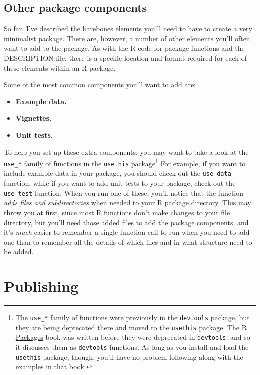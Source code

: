 \documentclass[]{tufte-book}
\providecommand{\tightlist}{%
  \setlength{\itemsep}{0pt}\setlength{\parskip}{0pt}}
\begin{document}
\hypertarget{other-package-components}{%
\subsection{Other package components}\label{other-package-components}}

So far, I've described the barebones elements you'll need to have to create a very
minimalist package. There are, however, a number of other elements you'll often
want to add to the package. As with the R code for package functions and the
DESCRIPTION file, there is a specific location and format required for each of
these elements within an R package.

Some of the most common components you'll want to add are:

\begin{itemize}
\tightlist
\item
  \textbf{Example data.}
\item
  \textbf{Vignettes.}
\item
  \textbf{Unit tests.}
\end{itemize}

To help you set up these extra components,
you may want to take a look at the \texttt{use\_*} family of functions in the \texttt{usethis}
\citep{R-usethis}
package\footnote{The \texttt{use\_*} family of functions were previously in the \texttt{devtools} package, but they
  are being deprecated there and moved to the \texttt{usethis}
  package. The \href{http://r-pkgs.had.co.nz/}{R Packages} book was written before they were deprecated
  in \texttt{devtools}, and so it discusses them as \texttt{devtools} functions. As long as you install and load
  the \texttt{usethis} package, though, you'll have no problem following along with the examples in
  that book.} For example, if you want to include example data in your package,
you should check out the \texttt{use\_data} function, while if you want to add unit tests to your
package, check out the \texttt{use\_test} function. When you run one of these, you'll notice that the
function \emph{adds files and subdirectories} when needed to your R package directory. This may
throw you at first, since most R functions don't make changes to your file directory, but
you'll need those added files to add the package components, and it's \emph{much} easier to
remember a single function call to run when you need to add one than to remember all the
details of which files and in what structure need to be added.

\hypertarget{publishing}{%
\section{Publishing}\label{publishing}}
\end{document}
